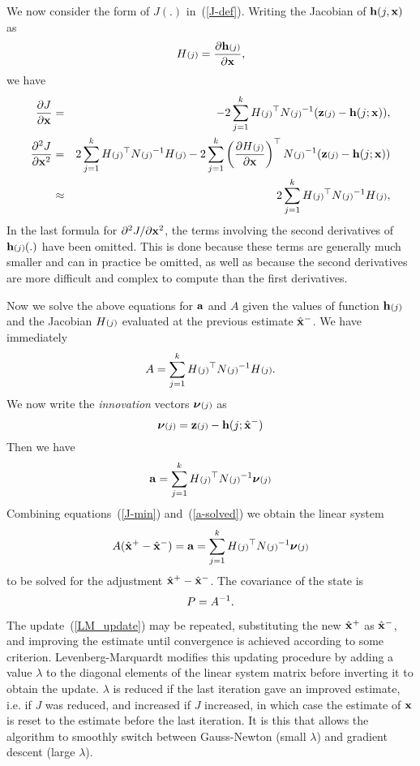 We now consider the form of $J(.)$ in~(\ref{J-def}).
Writing the Jacobian of ${\bf h}(j,{\bf x})$ as
\[ H{\scriptstyle (j)}=\frac{\partial {\bf h}{\scriptstyle (j)}}{\partial {\bf x}},
\]
we have
\begin{eqnarray}
 \frac{\partial J}{\partial {\bf x}} &=& -2\sum_{j=1}^k H{\scriptstyle (j)}^{\top} N{\scriptstyle (j)}^{-1} ({\bf z}{\scriptstyle (j)}-{\bf h}(j;{\bf x})), \label{Jp-def} \\
 \frac{\partial^2 J}{\partial {\bf x}^2} &=& 2\sum_{j=1}^k H{\scriptstyle (j)}^{\top} N{\scriptstyle (j)}^{-1} H{\scriptstyle (j)} - 2\sum_{j=1}^k \left(\frac{\partial H{\scriptstyle (j)}}{\partial {\bf x}}\right)^{\top} N{\scriptstyle (j)}^{-1} ({\bf z}{\scriptstyle (j)}-{\bf h}(j;{\bf x})) \nonumber \\
            &\approx& 2\sum_{j=1}^k H{\scriptstyle (j)}^{\top} N{\scriptstyle (j)}^{-1} H{\scriptstyle (j)}, \label{Jpp-def}
\end{eqnarray}
In the last formula for $\partial^2 J/\partial {\bf x}^2$, the terms
involving the second derivatives of ${\bf h}{\scriptstyle (j)}(.)$
have been omitted. This is done because these terms are
generally much smaller and can in practice be omitted, as well as because
the second derivatives are more difficult and complex to compute than the
first derivatives.

Now we solve the above equations for ${\bf a}$ and $A$ given
the values of function ${\bf h}{\scriptstyle (j)}$ and the Jacobian $H{\scriptstyle (j)}$
evaluated at the previous estimate $\hat{\bf x}^-$.
We have immediately
\[ A = \sum_{j=1}^k H{\scriptstyle (j)}^{\top} N{\scriptstyle (j)}^{-1} H{\scriptstyle (j)}.
\]
We now write the {\em innovation} vectors $\mbox{\boldmath $\nu$}{\scriptstyle (j)}$ as
\[ \mbox{\boldmath $\nu$}{\scriptstyle (j)} = {\bf z}{\scriptstyle (j)} - {\bf h}(j;\hat{\bf x}^-)
\]
Then we have
\begin{equation}
 {\bf a} = \sum_{j=1}^k H{\scriptstyle (j)}^{\top} N{\scriptstyle (j)}^{-1} \mbox{\boldmath $\nu$}{\scriptstyle (j)} \label{a-solved}
\end{equation}
Combining equations~(\ref{J-min}) and~(\ref{a-solved}) we
obtain the linear system
\begin{equation}
 A (\hat{\bf x}^+ - \hat{\bf x}^-) = {\bf a} = \sum_{j=1}^k H{\scriptstyle (j)}^{\top} N{\scriptstyle (j)}^{-1} \mbox{\boldmath $\nu$}{\scriptstyle (j)}
 \label{LM_update}
\end{equation}
to be solved for the adjustment $\hat{\bf x}^+ - \hat{\bf x}^-$.
The covariance of the state is
\[ P = A^{-1}.
\]

The update~(\ref{LM_update}) may be repeated,
substituting the new $\hat{\bf x}^+$ as $\hat{\bf x}^-$, and
improving the estimate until convergence is achieved according to some
criterion. Levenberg-Marquardt modifies this updating procedure by
adding a value $\lambda$ to the diagonal elements of the linear system matrix
before inverting it to obtain the update.
$\lambda$ is reduced if the last iteration gave
an improved estimate, i.e. if $J$ was reduced, and increased if $J$
increased, in which case the estimate of ${\bf x}$ is reset to the
estimate before the last iteration. It is this that allows the algorithm
to smoothly switch between Gauss-Newton (small $\lambda$) and gradient
descent (large $\lambda$).

